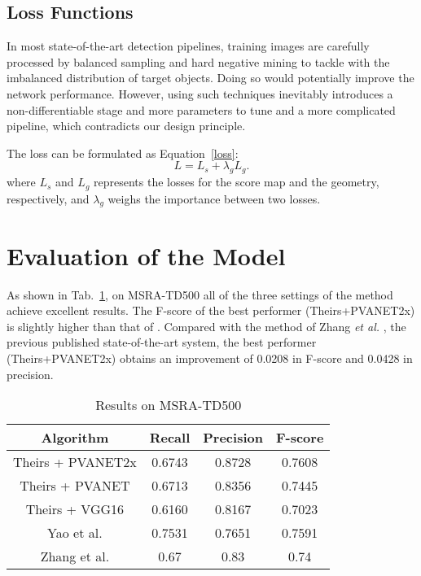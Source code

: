 \documentclass[10pt,twocolumn,letterpaper]{article}
\begin{document}
\subsection{Loss Functions}

In most state-of-the-art detection pipelines, training images are carefully processed by balanced sampling and hard negative mining to tackle with the imbalanced distribution of target objects. Doing so would potentially improve the network performance. However, using such techniques inevitably introduces a non-differentiable stage and more parameters to tune and a more complicated pipeline, which contradicts our design principle.

The loss can be formulated as Equation~\ref{loss}:
\begin{equation}
L=L_s+\lambda_g L_g.  \label{loss}
\end{equation}
where $L_s$ and $L_g$ represents the losses for the score map and the geometry, respectively, and $\lambda_g$ weighs the importance between two losses.

\section{Evaluation of the Model}

As shown in Tab.~\ref{t1}, on MSRA-TD500 all of the three settings of the method achieve excellent results. The F-score of the best performer (Theirs+PVANET2x) is slightly higher than that of \cite{article}. Compared with the method of Zhang \emph{et al.} \cite{Zhang2016Multi}, the previous published state-of-the-art system, the best performer (Theirs+PVANET2x) obtains an improvement of 0.0208 in F-score and 0.0428 in precision.

\begin{table}
	\caption{Results on MSRA-TD500}\label{t1}
	\begin{center}
		\begin{tabular}{|c|c|c|c|}
			\hline
			Algorithm & Recall  & Precision & F-score \\
			\hline\hline
			Theirs + PVANET2x & 0.6743 & 0.8728 & 0.7608 \\
			Theirs + PVANET & 0.6713 & 0.8356 & 0.7445 \\
			Theirs + VGG16 & 0.6160 & 0.8167 & 0.7023 \\
			Yao et al. \cite{article} & 0.7531 & 0.7651 & 0.7591 \\
			Zhang et al. \cite{Zhang2016Multi} & 0.67 & 0.83 & 0.74 \\
			\hline
		\end{tabular}
	\end{center}
\end{table}


{\small


}
\end{document}
